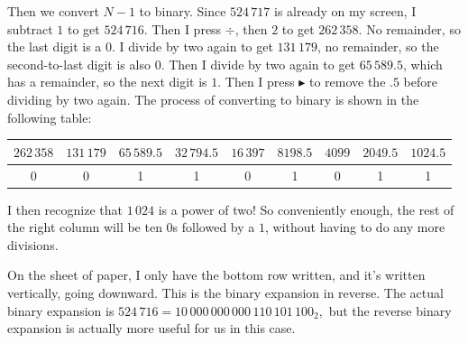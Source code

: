 \documentclass[11pt,paper=letter]{scrartcl}
\begin{document}
Then we convert $N-1$ to binary. Since $524\,717$ is already on my screen, I subtract $1$ to get $524\,716$. Then I press $\div$, then $2$ to get $262\,358$. No remainder, so the last digit is a $0$. I divide by two again to get $131\,179$, no remainder, so the second-to-last digit is also $0$. Then I divide by two again to get $65\,589.5$, which has a remainder, so the next digit is $1$. Then I press $\blacktriangleright$ to remove the $.5$ before dividing by two again. The process of converting to binary is shown in the following table:
\begin{center}
  \begin{tabular}{ccccccccc}
    $262\,358$ & $131\,179$ & $65\,589.5$  & $32\,794.5$  & $16\,397$  & $8198.5$   & $4099$   & $2049.5$ & $1024.5$ \\ \hline
    0 & 0 & 1 & 1 & 0 & 1 & 0 & 1 & 1
  \end{tabular}
\end{center}
I then recognize that $1\,024$ is a power of two! So conveniently enough, the rest of the right column will be ten $0$s followed by a $1$, without having to do any more divisions.

On the sheet of paper, I only have the bottom row written, and it's written vertically, going downward. This is the binary expansion in reverse. The actual binary expansion is $524\,716 = 10\,000\,000\,000\,110\,101\,100_2,$ but the reverse binary expansion is actually more useful for us in this case.
\end{document}
